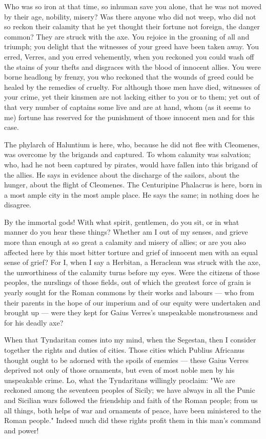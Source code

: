  Who was so iron at that time, so inhuman save you alone, that he was not moved by their age, nobility, misery? Was there anyone who did not weep, who did not so reckon their calamity that he yet thought their fortune not foreign, the danger common? They are struck with the axe. You rejoice in the groaning of all and triumph; you delight that the witnesses of your greed have been taken away. You erred, Verres, and you erred vehemently, when you reckoned you could wash off the stains of your thefts and disgraces with the blood of innocent allies. You were borne headlong by frenzy, you who reckoned that the wounds of greed could be healed by the remedies of cruelty. For although those men have died, witnesses of your crime, yet their kinsmen are not lacking either to you or to them; yet out of that very number of captains some live and are at hand, whom (as it seems to me) fortune has reserved for the punishment of those innocent men and for this case.

 The phylarch of Haluntium is here, who, because he did not flee with Cleomenes, was overcome by the brigands and captured. To whom calamity was salvation; who, had he not been captured by pirates, would have fallen into this brigand of the allies. He says in evidence about the discharge of the sailors, about the hunger, about the flight of Cleomenes. The Centuripine Phalacrus is here, born in a most ample city in the most ample place. He says the same; in nothing does he disagree.

 By the immortal gods! With what spirit, gentlemen, do you sit, or in what manner do you hear these things? Whether am I out of my senses, and grieve more than enough at so great a calamity and misery of allies; or are you also affected here by this most bitter torture and grief of innocent men with an equal sense of grief? For I, when I say a Herbitan, a Heraclean was struck with the axe, the unworthiness of the calamity turns before my eyes. Were the citizens of those peoples, the nurslings of those fields, out of which the greatest force of grain is yearly sought for the Roman commons by their works and labours --- who from their parents in the hope of our imperium and of our equity were undertaken and brought up --- were they kept for Gaius Verres's unspeakable monstrousness and for his deadly axe?

 When that Tyndaritan comes into my mind, when the Segestan, then I consider together the rights and duties of cities. Those cities which Publius Africanus thought ought to be adorned with the spoils of enemies --- these Gaius Verres deprived not only of those ornaments, but even of most noble men by his unspeakable crime. Lo, what the Tyndaritans willingly proclaim: "We are reckoned among the seventeen peoples of Sicily; we have always in all the Punic and Sicilian wars followed the friendship and faith of the Roman people; from us all things, both helps of war and ornaments of peace, have been ministered to the Roman people." Indeed much did these rights profit them in this man's command and power!


